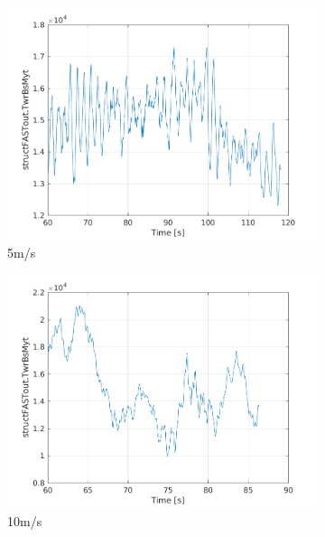 \documentclass[10pt]{article}
\begin{document}
\begin{figure}[H]
  \centering
\begin{subfigure}{0.40\textwidth}
  \includegraphics[width=1\linewidth]{../CIP_6/FAST/Plots_ws5/TwrBsMyt.png}
  \caption{5m/s}
\end{subfigure}
\begin{subfigure}{0.40\textwidth}
  \includegraphics[width=1\linewidth]{../CIP_6/FAST/Plots_ws10/TwrBsMyt.png}
  \caption{10m/s}
\end{subfigure}
\begin{subfigure}{0.40\textwidth}

\end{subfigure}
\end{figure}
\end{document}

